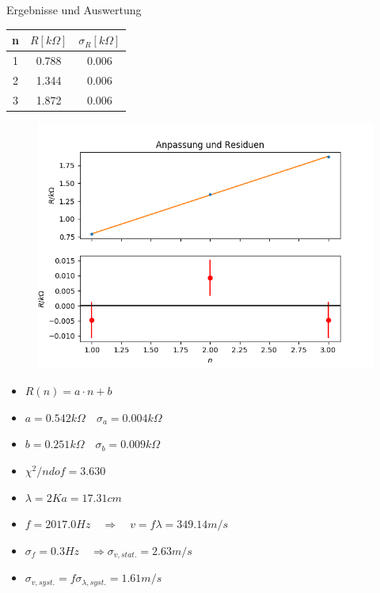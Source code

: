 \documentclass[12pt]{beamer}
\begin{document}
	\begin{frame}{Ergebnisse und Auswertung}
	\begin{table}
	\begin{tabular}{|c|c|c|}
	\hline 
	n & $R[k\Omega]$ & $\sigma_R[k\Omega]$ \\ 
	\hline 
	1 & 0.788 & 0.006 \\ 
	\hline 
	2 & 1.344 & 0.006 \\ 
	\hline 
	3 & 1.872 & 0.006 \\ 
	\hline 
	\end{tabular} 
	\end{table}
	
	\begin{figure}
	\includegraphics[scale=0.37]{fitdruckknoten}
	\end{figure}
	\end{frame}
	
	\begin{frame}
	\begin{itemize}
	\item $R(n)=a \cdot n+b$
	\item $a=0.542k\Omega \quad \sigma_{a}=0.004k\Omega$
	\item $b=0.251k\Omega \quad \sigma_b=0.009k\Omega$
	\item $\chi^2/ndof=3.630$
	\item $\lambda=2Ka=17.31cm$
	\item $f=2017.0Hz \quad \Rightarrow \quad v=f \lambda = 349.14m/s$
	\item $\sigma_f=0.3Hz \quad \Rightarrow \sigma_{v,stat.}=2.63m/s$
	\item $\sigma_{v,syst.}=f \sigma_{\lambda,syst.}=1.61m/s$
	\end{itemize}
	\end{frame}
	
\end{document}

